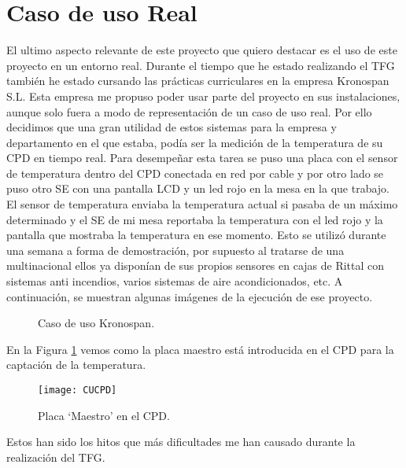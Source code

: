 \section{Caso de uso Real}
El ultimo aspecto relevante de este proyecto que quiero destacar es el uso de este proyecto en un entorno real. Durante el tiempo que he estado realizando el TFG también he estado cursando las prácticas curriculares en la empresa Kronospan S.L. Esta empresa me propuso poder usar parte del proyecto en sus instalaciones, aunque solo fuera a modo de representación de un caso de uso real. Por ello decidimos que una gran utilidad de estos sistemas para la empresa y departamento en el que estaba, podía ser la medición de la temperatura de su CPD en tiempo real. Para desempeñar esta tarea se puso una placa con el sensor de temperatura dentro del CPD conectada en red por cable y por otro lado se puso otro SE con una pantalla LCD y un led rojo en la mesa en la que trabajo. El sensor de temperatura enviaba la temperatura actual si pasaba de un máximo determinado y el SE de mi mesa reportaba la temperatura con el led rojo y la pantalla que mostraba la temperatura en ese momento. Esto se utilizó durante una semana a forma de demostración, por supuesto al tratarse de una multinacional ellos ya disponían de sus propios sensores en cajas de Rittal con sistemas anti incendios, varios sistemas de aire acondicionados, etc. A continuación, se muestran algunas imágenes de la ejecución de ese proyecto.

\begin{figure}[!h]
 \centering
 \caption{Caso de uso Kronospan.}
\end{figure}

\clearpage

En la Figura \ref{CPD} vemos como la placa maestro está introducida en el CPD para la captación de la temperatura.
\begin{figure}[!h]
	\centering
	\texttt{[image: CUCPD]}
	\caption{Placa `Maestro' en el CPD.}\label{CPD}
\end{figure}

Estos han sido los hitos que más dificultades me han causado durante la realización del TFG.









